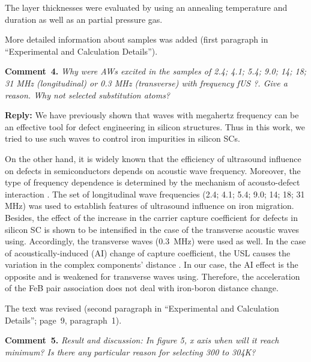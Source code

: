 \documentclass[sn-mathphys]{sn-jnl}
\begin{document}
The layer thicknesses were evaluated by using an annealing  temperature and duration as well as an partial pressure gas.

More detailed information about samples was added
(first paragraph in ``Experimental and Calculation Details'').


\vspace{1cm}
\noindent
\textcolor[rgb]{0.00,0.50,1.00}{\textbf{Comment~4.}}
\emph{Why were AWs excited in the samples of 2.4; 4.1; 5.4; 9.0; 14; 18; 31 MHz (longitudinal) or 0.3 MHz (transverse) with frequency fUS ?. Give a reason. Why not selected substitution atoms?}

\noindent
\textcolor[rgb]{0.51,0.00,0.00}{\textbf{Reply:}}
We have previously shown \cite{Olikh2018SM,Olikh2018JAP,OlikhJAP,GORB2020,Olikh:Ultras,Olikh:Ultras2016}
that waves with megahertz frequency can be an effective tool for defect engineering in silicon structures.
Thus in this work, we tried to use such waves to control iron impurities in silicon SCs.

On the other hand,
it is widely known that the efficiency of ultrasound influence on defects
in semiconductors depends on acoustic wave frequency.
Moreover, the type of frequency dependence is determined by the mechanism of acousto-defect
interaction \cite{Brailsford,Pavlovich,PeleshchakUJF2016}.
The set of longitudinal wave frequencies (2.4; 4.1; 5.4; 9.0; 14; 18; 31 MHz)
was used to establish features of
ultrasound influence on iron migration.
Besides,  the effect of the increase in the carrier capture coefficient for defects in silicon SC
is shown \cite{Olikh2018SM} to be intensified in the case of the transverse acoustic waves using.
Accordingly, the transverse waves (0.3~MHz) were used as well.
In the case of acoustically-induced (AI) change of capture coefficient, the
USL causes the variation in the complex components' distance \cite{Olikh2018SM}.
 In our case, the AI effect is the opposite and is weakened for transverse waves using.
Therefore, the acceleration of the FeB pair association does not deal with iron-boron distance change.

The text was revised
(second paragraph in ``Experimental and Calculation Details'';
page~9, paragraph~1).


\vspace{1cm}
\noindent
\textcolor[rgb]{0.00,0.50,1.00}{\textbf{Comment~5.}}
\emph{Result and discussion: In figure 5, x axis when will it reach minimum? Is there any particular reason for selecting 300 to 304K?}
\end{document}
